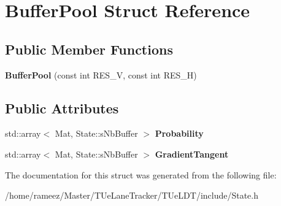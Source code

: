 \hypertarget{structBufferPool}{\section{Buffer\-Pool Struct Reference}
\label{structBufferPool}
}
\subsection*{Public Member Functions}
\begin{DoxyCompactItemize}
\item 
\hypertarget{structBufferPool_a308f8fe879033bfed29a5aa9878e9bf4}{{\bfseries Buffer\-Pool} (const int R\-E\-S\-\_\-\-V, const int R\-E\-S\-\_\-\-H)}\label{structBufferPool_a308f8fe879033bfed29a5aa9878e9bf4}

\end{DoxyCompactItemize}
\subsection*{Public Attributes}
\begin{DoxyCompactItemize}
\item 
\hypertarget{structBufferPool_ae49e6984dda0b1968e6dd9ded3539453}{std\-::array$<$ Mat, State\-::s\-Nb\-Buffer $>$ {\bfseries Probability}}\label{structBufferPool_ae49e6984dda0b1968e6dd9ded3539453}

\item 
\hypertarget{structBufferPool_a30aaffee46f5a4121b349615488bbe9b}{std\-::array$<$ Mat, State\-::s\-Nb\-Buffer $>$ {\bfseries Gradient\-Tangent}}\label{structBufferPool_a30aaffee46f5a4121b349615488bbe9b}

\end{DoxyCompactItemize}


The documentation for this struct was generated from the following file\-:\begin{DoxyCompactItemize}
\item 
/home/rameez/\-Master/\-T\-Ue\-Lane\-Tracker/\-T\-Ue\-L\-D\-T/include/State.\-h\end{DoxyCompactItemize}
